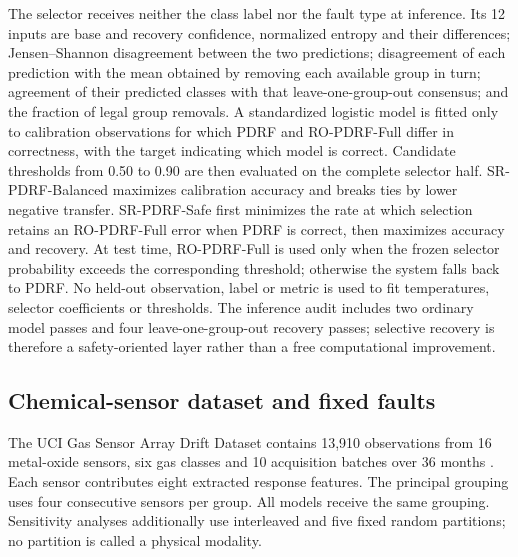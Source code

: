 \documentclass[11pt]{article}
\begin{document}
The selector receives neither the class label nor the fault type at inference. Its 12 inputs are base and recovery confidence, normalized entropy and their differences; Jensen--Shannon disagreement between the two predictions; disagreement of each prediction with the mean obtained by removing each available group in turn; agreement of their predicted classes with that leave-one-group-out consensus; and the fraction of legal group removals. A standardized logistic model is fitted only to calibration observations for which PDRF and RO-PDRF-Full differ in correctness, with the target indicating which model is correct. Candidate thresholds from 0.50 to 0.90 are then evaluated on the complete selector half. SR-PDRF-Balanced maximizes calibration accuracy and breaks ties by lower negative transfer. SR-PDRF-Safe first minimizes the rate at which selection retains an RO-PDRF-Full error when PDRF is correct, then maximizes accuracy and recovery. At test time, RO-PDRF-Full is used only when the frozen selector probability exceeds the corresponding threshold; otherwise the system falls back to PDRF. No held-out observation, label or metric is used to fit temperatures, selector coefficients or thresholds. The inference audit includes two ordinary model passes and four leave-one-group-out recovery passes; selective recovery is therefore a safety-oriented layer rather than a free computational improvement.

\subsection{Chemical-sensor dataset and fixed faults}

The UCI Gas Sensor Array Drift Dataset contains 13,910 observations from 16 metal-oxide sensors, six gas classes and 10 acquisition batches over 36 months \citep{vergara2012dataset,vergara2012drift}. Each sensor contributes eight extracted response features. The principal grouping uses four consecutive sensors per group. All models receive the same grouping. Sensitivity analyses additionally use interleaved and five fixed random partitions; no partition is called a physical modality.
\end{document}
